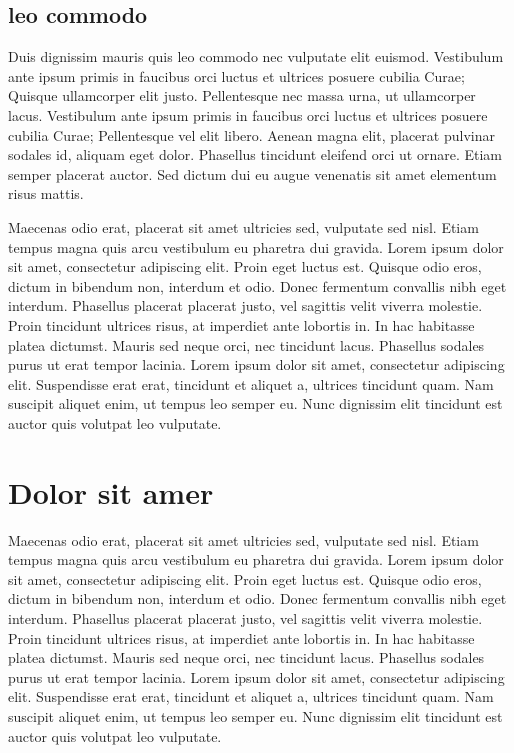 \documentclass[twoside,emptyfirstpagenumber,swedish]{../thesis}
\begin{document}
\subsection{leo commodo}

Duis dignissim mauris quis leo commodo nec vulputate elit euismod. Vestibulum ante ipsum primis in faucibus orci luctus et ultrices posuere cubilia Curae; Quisque ullamcorper elit justo. Pellentesque nec massa urna, ut ullamcorper lacus. Vestibulum ante ipsum primis in faucibus orci luctus et ultrices posuere cubilia Curae; Pellentesque vel elit libero. Aenean magna elit, placerat pulvinar sodales id, aliquam eget dolor. Phasellus tincidunt eleifend orci ut ornare. Etiam semper placerat auctor. Sed dictum dui eu augue venenatis sit amet elementum risus mattis.

Maecenas odio erat, placerat sit amet ultricies sed, vulputate sed nisl. Etiam tempus magna quis arcu vestibulum eu pharetra dui gravida. Lorem ipsum dolor sit amet, consectetur adipiscing elit. Proin eget luctus est. Quisque odio eros, dictum in bibendum non, interdum et odio. Donec fermentum convallis nibh eget interdum. Phasellus placerat placerat justo, vel sagittis velit viverra molestie. Proin tincidunt ultrices risus, at imperdiet ante lobortis in. In hac habitasse platea dictumst. Mauris sed neque orci, nec tincidunt lacus. Phasellus sodales purus ut erat tempor lacinia. Lorem ipsum dolor sit amet, consectetur adipiscing elit. Suspendisse erat erat, tincidunt et aliquet a, ultrices tincidunt quam. Nam suscipit aliquet enim, ut tempus leo semper eu. Nunc dignissim elit tincidunt est auctor quis volutpat leo vulputate.

\section{Dolor sit amer}

Maecenas odio erat, placerat sit amet ultricies sed, vulputate sed nisl. Etiam tempus magna quis arcu vestibulum eu pharetra dui gravida. Lorem ipsum dolor sit amet, consectetur adipiscing elit. Proin eget luctus est. Quisque odio eros, dictum in bibendum non, interdum et odio. Donec fermentum convallis nibh eget interdum. Phasellus placerat placerat justo, vel sagittis velit viverra molestie. Proin tincidunt ultrices risus, at imperdiet ante lobortis in. In hac habitasse platea dictumst. Mauris sed neque orci, nec tincidunt lacus. Phasellus sodales purus ut erat tempor lacinia. Lorem ipsum dolor sit amet, consectetur adipiscing elit. Suspendisse erat erat, tincidunt et aliquet a, ultrices tincidunt quam. Nam suscipit aliquet enim, ut tempus leo semper eu. Nunc dignissim elit tincidunt est auctor quis volutpat leo vulputate.
\end{document}
